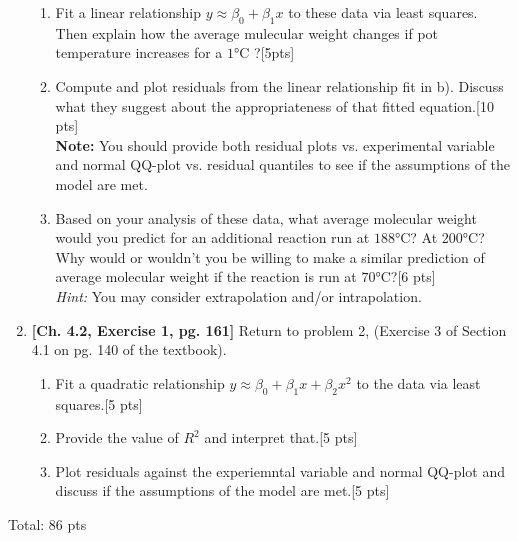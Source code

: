 \documentclass[11pt]{article}\usepackage[]{graphicx}\usepackage[]{color}
\begin{document}
\begin{enumerate}
\begin{enumerate}
    \item Fit a linear relationship $y \approx \beta_0 + \beta_1 x$ to these data via least squares. Then explain  how the average mulecular weight changes if pot temperature increases for a $1$°C ?[5pts]
    
    \item Compute and plot residuals from the linear relationship fit in b). Discuss what they suggest about the appropriateness of that fitted equation.[10 pts]\\
    \textbf{Note:} You should provide both residual plots vs. experimental variable and normal QQ-plot vs. residual quantiles to see if the assumptions of the model are met. 
    

    \item Based on your analysis of these data, what average molecular weight would you predict for an additional reaction run at $188$°C? At $200$°C? Why would or wouldn't you be willing to make a similar prediction of average molecular weight if the reaction is run at $70$°C?[6 pts]\\
    \emph{Hint:} You may consider extrapolation and/or intrapolation.
	
	\end{enumerate}

	
	\item  \textbf{[Ch. 4.2, Exercise 1, pg. 161]} Return to problem 2, (Exercise 3 of Section 4.1 on pg. 140 of the textbook). 
	\begin{enumerate}
	
	  \item Fit a quadratic relationship $y \approx \beta_0 + \beta_1 x + \beta_2 x^2$ to the data via least squares.[5 pts] 
	  \item Provide the value of $R^2$ and interpret that.[5 pts]
	  \item Plot residuals against the experiemntal variable and normal QQ-plot and discuss if the assumptions of the model are met.[5 pts]
	 
  \end{enumerate}



\end{enumerate}	

Total: 86 pts
\end{document}
